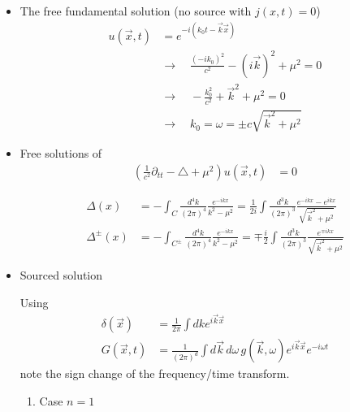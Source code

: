 \documentclass[../main.tex]{subfiles}
\begin{document}
\begin{itemize}
\item The free fundamental solution (no source with $j(x,t)=0$)
\begin{align}
u(\vec{x},t)&=e^{-i(k_0t-\vec{k}\vec{x})}\\
&\rightarrow\quad \frac{(-ik_0)^2}{c^2}-(i\vec{k})^2+\mu^2=0\\
&\rightarrow\quad -\frac{k_0^2}{c^2}+\vec{k}^2+\mu^2=0\\
&\rightarrow\quad k_0=\omega=\pm c\sqrt{\vec{k}^2+\mu^2}
\end{align}

\item Free solutions of
\begin{align}
\left(\frac{1}{c^2}\partial_{tt}-\triangle+\mu^2\right) u(\vec{x},t)&=0
\end{align}

\begin{align}
\varDelta(x)
&=-\int_C\frac{d^4k}{(2\pi)^4}\frac{e^{-ikx}}{k^2-\mu^2}=\frac{1}{2i}\int\frac{d^3k}{(2\pi)^3}\frac{e^{-ikx}-e^{ikx}}{\sqrt{\vec{k}^2+\mu^2}}\\
\varDelta^\pm(x)
&=-\int_{C^\pm}\frac{d^4k}{(2\pi)^4}\frac{e^{-ikx}}{k^2-\mu^2}=\mp\frac{i}{2}\int\frac{d^3k}{(2\pi)^3}\frac{e^{\mp ikx}}{\sqrt{\vec{k}^2+\mu^2}}
\end{align}

\item Sourced solution

Using
\begin{align}
\delta(\vec{x})&=\frac{1}{2\pi}\int dk e^{i\vec{k}\vec{x}}\\
G(\vec{x},t)&=\frac{1}{(2\pi)^d}\int d\vec{k}\,d\omega\,g(\vec{k},\omega)e^{i\vec{k}\vec{x}}e^{-i\omega t}
\end{align}
note the sign change of the frequency/time transform.

\begin{enumerate}
\item Case $n=1$


\end{enumerate}
\end{itemize}
\end{document}
